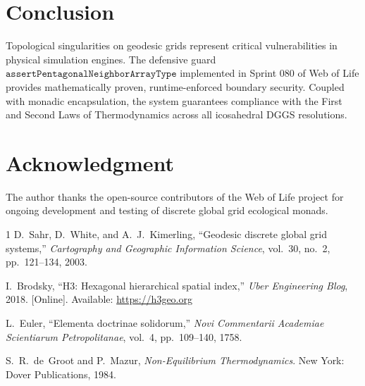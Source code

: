 \documentclass[10pt,journal,compsoc]{IEEEtran}
\begin{document}
\section{Conclusion}
Topological singularities on geodesic grids represent critical vulnerabilities in physical simulation engines. The defensive guard $\texttt{assertPentagonalNeighborArrayType}$ implemented in Sprint 080 of Web of Life provides mathematically proven, runtime-enforced boundary security. Coupled with monadic encapsulation, the system guarantees compliance with the First and Second Laws of Thermodynamics across all icosahedral DGGS resolutions.

\section*{Acknowledgment}
The author thanks the open-source contributors of the Web of Life project for ongoing development and testing of discrete global grid ecological monads.

\begin{thebibliography}{1}
D.~Sahr, D.~White, and A.~J.~Kimerling, ``Geodesic discrete global grid systems,'' \emph{Cartography and Geographic Information Science}, vol.~30, no.~2, pp.~121--134, 2003.

I.~Brodsky, ``H3: Hexagonal hierarchical spatial index,'' \emph{Uber Engineering Blog}, 2018. [Online]. Available: \url{https://h3geo.org}

L.~Euler, ``Elementa doctrinae solidorum,'' \emph{Novi Commentarii Academiae Scientiarum Petropolitanae}, vol.~4, pp.~109--140, 1758.

S.~R.~de~Groot and P.~Mazur, \emph{Non-Equilibrium Thermodynamics}. New York: Dover Publications, 1984.
\end{thebibliography}
\end{document}

